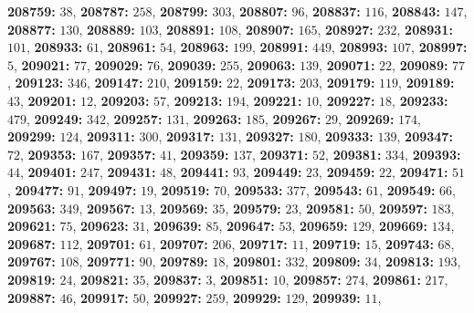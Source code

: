 \textsf{\bfseries 208759:} $38$, \textsf{\bfseries 208787:} $258$, \textsf{\bfseries 208799:} $303$, \textsf{\bfseries 208807:} $96$, \textsf{\bfseries 208837:} $116$, \textsf{\bfseries 208843:} $147$, \textsf{\bfseries 208877:} $130$, \textsf{\bfseries 208889:} $103$, \textsf{\bfseries 208891:} $108$, \textsf{\bfseries 208907:} $165$, \textsf{\bfseries 208927:} $232$, \textsf{\bfseries 208931:} $101$, \textsf{\bfseries 208933:} $61$, \textsf{\bfseries 208961:} $54$, \textsf{\bfseries 208963:} $199$, \textsf{\bfseries 208991:} $449$, \textsf{\bfseries 208993:} $107$, \textsf{\bfseries 208997:} $5$, \textsf{\bfseries 209021:} $77$, \textsf{\bfseries 209029:} $76$, \textsf{\bfseries 209039:} $255$, \textsf{\bfseries 209063:} $139$, \textsf{\bfseries 209071:} $22$, \textsf{\bfseries 209089:} $77$, \textsf{\bfseries 209123:} $346$, \textsf{\bfseries 209147:} $210$, \textsf{\bfseries 209159:} $22$, \textsf{\bfseries 209173:} $203$, \textsf{\bfseries 209179:} $119$, \textsf{\bfseries 209189:} $43$, \textsf{\bfseries 209201:} $12$, \textsf{\bfseries 209203:} $57$, \textsf{\bfseries 209213:} $194$, \textsf{\bfseries 209221:} $10$, \textsf{\bfseries 209227:} $18$, \textsf{\bfseries 209233:} $479$, \textsf{\bfseries 209249:} $342$, \textsf{\bfseries 209257:} $131$, \textsf{\bfseries 209263:} $185$, \textsf{\bfseries 209267:} $29$, \textsf{\bfseries 209269:} $174$, \textsf{\bfseries 209299:} $124$, \textsf{\bfseries 209311:} $300$, \textsf{\bfseries 209317:} $131$, \textsf{\bfseries 209327:} $180$, \textsf{\bfseries 209333:} $139$, \textsf{\bfseries 209347:} $72$, \textsf{\bfseries 209353:} $167$, \textsf{\bfseries 209357:} $41$, \textsf{\bfseries 209359:} $137$, \textsf{\bfseries 209371:} $52$, \textsf{\bfseries 209381:} $334$, \textsf{\bfseries 209393:} $44$, \textsf{\bfseries 209401:} $247$, \textsf{\bfseries 209431:} $48$, \textsf{\bfseries 209441:} $93$, \textsf{\bfseries 209449:} $23$, \textsf{\bfseries 209459:} $22$, \textsf{\bfseries 209471:} $51$, \textsf{\bfseries 209477:} $91$, \textsf{\bfseries 209497:} $19$, \textsf{\bfseries 209519:} $70$, \textsf{\bfseries 209533:} $377$, \textsf{\bfseries 209543:} $61$, \textsf{\bfseries 209549:} $66$, \textsf{\bfseries 209563:} $349$, \textsf{\bfseries 209567:} $13$, \textsf{\bfseries 209569:} $35$, \textsf{\bfseries 209579:} $23$, \textsf{\bfseries 209581:} $50$, \textsf{\bfseries 209597:} $183$, \textsf{\bfseries 209621:} $75$, \textsf{\bfseries 209623:} $31$, \textsf{\bfseries 209639:} $85$, \textsf{\bfseries 209647:} $53$, \textsf{\bfseries 209659:} $129$, \textsf{\bfseries 209669:} $134$, \textsf{\bfseries 209687:} $112$, \textsf{\bfseries 209701:} $61$, \textsf{\bfseries 209707:} $206$, \textsf{\bfseries 209717:} $11$, \textsf{\bfseries 209719:} $15$, \textsf{\bfseries 209743:} $68$, \textsf{\bfseries 209767:} $108$, \textsf{\bfseries 209771:} $90$, \textsf{\bfseries 209789:} $18$, \textsf{\bfseries 209801:} $332$, \textsf{\bfseries 209809:} $34$, \textsf{\bfseries 209813:} $193$, \textsf{\bfseries 209819:} $24$, \textsf{\bfseries 209821:} $35$, \textsf{\bfseries 209837:} $3$, \textsf{\bfseries 209851:} $10$, \textsf{\bfseries 209857:} $274$, \textsf{\bfseries 209861:} $217$, \textsf{\bfseries 209887:} $46$, \textsf{\bfseries 209917:} $50$, \textsf{\bfseries 209927:} $259$, \textsf{\bfseries 209929:} $129$, \textsf{\bfseries 209939:} $11$, 
